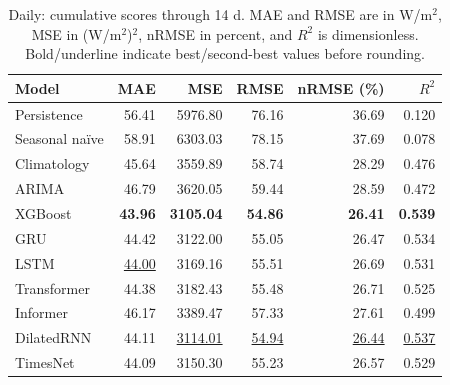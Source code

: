 \begin{table}[!htbp]
\centering
\small
\setlength{\tabcolsep}{6pt}
\caption{Daily: cumulative scores through 14 d. MAE and RMSE are in W/m$^2$, MSE in (W/m$^2$)$^2$, nRMSE in percent, and $R^2$ is dimensionless. Bold/underline indicate best/second-best values before rounding.}
\label{tab:baseline_daily_30_14}
\begin{tabular}{@{}lrrrrr@{}}
\toprule
Model & MAE & MSE & RMSE & nRMSE (\%) & $R^2$ \\
\midrule
Persistence & 56.41 & 5976.80 & 76.16 & 36.69 & 0.120 \\
Seasonal na\"ive & 58.91 & 6303.03 & 78.15 & 37.69 & 0.078 \\
Climatology & 45.64 & 3559.89 & 58.74 & 28.29 & 0.476 \\
ARIMA & 46.79 & 3620.05 & 59.44 & 28.59 & 0.472 \\
XGBoost & \textbf{43.96} & \textbf{3105.04} & \textbf{54.86} & \textbf{26.41} & \textbf{0.539} \\
GRU & 44.42 & 3122.00 & 55.05 & 26.47 & 0.534 \\
LSTM & \underline{44.00} & 3169.16 & 55.51 & 26.69 & 0.531 \\
Transformer & 44.38 & 3182.43 & 55.48 & 26.71 & 0.525 \\
Informer & 46.17 & 3389.47 & 57.33 & 27.61 & 0.499 \\
DilatedRNN & 44.11 & \underline{3114.01} & \underline{54.94} & \underline{26.44} & \underline{0.537} \\
TimesNet & 44.09 & 3150.30 & 55.23 & 26.57 & 0.529 \\
\bottomrule
\end{tabular}
\end{table}

